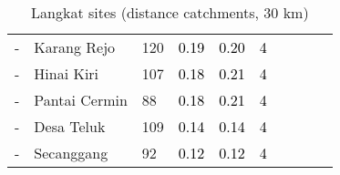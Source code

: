 \begin{table}[ht]
\begin{tabular}{C{0.05\textwidth}C{0.15\textwidth}C{0.08\textwidth}C{0.08\textwidth}C{0.08\textwidth}C{0.08\textwidth}C{0.08\textwidth}C{0.08\textwidth}C{0.08\textwidth}C{0.08\textwidth}}
  {-} & Karang Rejo & 120 & \textcolor[HTML]{000000}{0.19} & \textcolor[HTML]{000000}{0.20} & \textcolor[HTML]{000000}{4} &  &  &  &  \\ 
  {-} & Hinai Kiri & 107 & \textcolor[HTML]{000000}{0.18} & \textcolor[HTML]{000000}{0.21} & \textcolor[HTML]{000000}{4} &  &  &  &  \\ 
  {-} & Pantai Cermin &  88 & \textcolor[HTML]{000000}{0.18} & \textcolor[HTML]{000000}{0.21} & \textcolor[HTML]{000000}{4} &  &  &  &  \\ 
  {-} & Desa Teluk & 109 & \textcolor[HTML]{000000}{0.14} & \textcolor[HTML]{000000}{0.14} & \textcolor[HTML]{000000}{4} &  &  &  &  \\ 
  {-} & Secanggang &  92 & \textcolor[HTML]{000000}{0.12} & \textcolor[HTML]{000000}{0.12} & \textcolor[HTML]{000000}{4} &  &  &  &  \\ 
  \end{tabular}
\endgroup
\caption{Langkat sites (distance catchments, 30 km)} 
\label{tab:langkat_dist}
\end{table}
